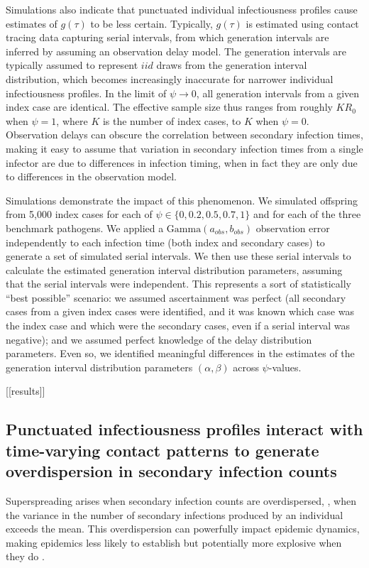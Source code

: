 Simulations also indicate that punctuated individual infectiousness profiles cause estimates of $g(\tau)$ to be less certain. Typically, $g(\tau)$ is estimated using contact tracing data capturing serial intervals, from which generation intervals are inferred by assuming an observation delay model. The generation intervals are typically assumed to represent $iid$ draws from the generation interval distribution, which becomes increasingly inaccurate for narrower individual infectiousness profiles. In the limit of $\psi \rightarrow 0$, all generation intervals from a given index case are identical. The effective sample size thus ranges from roughly $K R_0$ when $\psi = 1$, where $K$ is the number of index cases, to $K$ when $\psi = 0$. Observation delays can obscure the correlation between secondary infection times, making it easy to assume that variation in secondary infection times from a single infector are due to differences in infection timing, when in fact they are only due to differences in the observation model. 

Simulations demonstrate the impact of this phenomenon. We simulated offspring from 5,000 index cases for each of $\psi \in \{0, 0.2, 0.5, 0.7, 1\}$ and for each of the three benchmark pathogens. We applied a $\text{Gamma}(a_{obs}, b_{obs})$ observation error independently to each infection time (both index and secondary cases) to generate a set of simulated serial intervals. We then use these serial intervals to calculate the estimated generation interval distribution parameters, assuming that the serial intervals were independent. This represents a sort of statistically ``best possible'' scenario: we assumed ascertainment was perfect (all secondary cases from a given index cases were identified, and it was known which case was the index case and which were the secondary cases, even if a serial interval was negative); and we assumed perfect knowledge of the delay distribution parameters. Even so, we identified meaningful differences in the estimates of the generation interval distribution parameters $(\alpha, \beta)$ across $\psi$-values. 

[[results]]

\subsection{Punctuated infectiousness profiles interact with time-varying contact patterns to generate overdispersion in secondary infection counts}

Superspreading arises when secondary infection counts are overdispersed, \ie,  when the variance in the number of secondary infections produced by an individual exceeds the mean. This overdispersion can powerfully impact epidemic dynamics, making epidemics less likely to establish but potentially more explosive when they do \citep{lloyd-smith_superspreading_2005}. 

